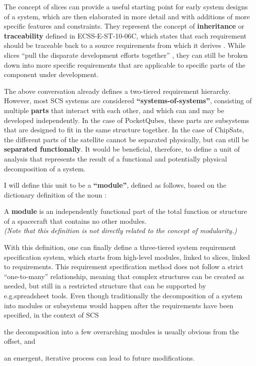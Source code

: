 \documentclass[a4paper,nobib,justified,final]{tufte-book}
\begin{document}
The concept of slices can provide a useful starting point for early system designs of a system, which are then elaborated in more detail and with additions of more specific features and constraints. They represent the concept of \textbf{inheritance} or \textbf{traceability} defined in ECSS-E-ST-10-06C, which states that each requirement should be traceable back to a source requirements from which it derives \autocite{ECSS-E-ST-10-06C}. While slices ``pull the disparate development efforts together'' \cite{radekaWhenAgileGets2022}, they can still be broken down into more specific requirements that are applicable to specific parts of the component under development.

The above conversation already defines a two-tiered requirement hierarchy. However, most \acs{SCS} systems are considered \textbf{``systems-of-systems''}, consisting of multiple \textbf{parts} that interact with each other, and which can and may be developed independently. In the case of PocketQubes, these parts are subsystems that are designed to fit in the same structure together. In the case of ChipSats, the different parts of the satellite cannot be separated physically, but can still be \textbf{separated functionally}. It would be beneficial, therefore, to define a unit of analysis that represents the result of a functional and potentially physical decomposition of a system.

I will define this unit to be a \textbf{``module''}, defined as follows, based on the dictionary definition of the noun \autocite{merriam-websterDefinitionMODULE2026}:
\begin{definition}[Module]
	A \textbf{module} is an independently functional part of the total function or structure of a spacecraft that contains no other modules. \\%
	\emph{(Note that this definition is not directly related to the concept of modularity.)}
	\label{def:module}
\end{definition}

With this definition, one can finally define a three-tiered system requirement specification system, which starts from high-level modules, linked to slices, linked to requirements. This requirement specification method does not follow a strict ``one-to-many'' relationship, meaning that complex structures can be created as needed, but still in a restricted structure that can be supported by e.g.\@ spreadsheet tools. Even though traditionally the decomposition of a system into modules or subsystems would happen after the requirements have been specified, in the context of \acs{SCS} \begin{enumerate*}
	\item the decomposition into a few overarching modules is usually obvious from the offset, and 
	\item an emergent, iterative process can lead to future modifications.
\end{enumerate*}
\end{document}
